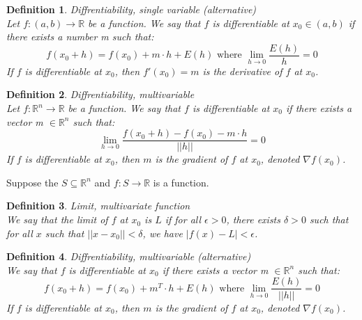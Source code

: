 \documentclass[11pt]{book} %
\newtheorem{definition}{Definition}[section]
\begin{document}
\bigbreak

\begin{definition}{Diffrentiability, single variable (alternative)} \\
Let $f: (a,b) \rightarrow \mathbb{R}$ be a function. We say that $f$ is differentiable at $x_0 \in (a,b)$ if there exists a number m such that:
\begin{equation}
    f(x_0 + h) = f(x_0) + m \cdot h + E(h) \text{ where } \lim_{h \rightarrow 0} \frac{E(h)}{h} = 0
\end{equation}
If $f$ is differentiable at $x_0$, then $f'(x_0) = m$ is the derivative of $f$ at $x_0$.
\end{definition}

\bigbreak

\begin{definition}{Diffrentiability, multivariable} \\
Let $f: \mathbb{R}^n \rightarrow \mathbb{R}$ be a function. We say that $f$ is differentiable at $x_0$ if there exists a vector m $\in \mathbb{R}^n$ such that:
\begin{equation}
    \lim_{h \rightarrow 0} \frac{f(x_0 + h) - f(x_0) - m \cdot h}{||h||} = 0
\end{equation}
If $f$ is differentiable at $x_0$, then $m$ is the gradient of $f$ at $x_0$, denoted $\nabla f(x_0)$.
\end{definition}

\bigbreak

Suppose the $S \subseteq \mathbb{R}^n$ and $f: S \rightarrow \mathbb{R}$ is a function. 

\bigbreak

\begin{definition}{Limit, multivariate function} \\
We say that the limit of $f$ at $x_0$ is $L$ if for all $\epsilon > 0$, there exists $\delta > 0$ such that 
for all $x$ such that $||x - x_0|| < \delta$, we have $|f(x) - L| < \epsilon$.
\end{definition}

\begin{definition}{Diffrentiability, multivariable (alternative)} \\
We say that $f$ is differentiable at $x_0$ if there exists a vector m $\in \mathbb{R}^n$ such that:
\begin{equation}
    f(x_0 + h) = f(x_0) + m^T \cdot h + E(h) \text{ where } \lim_{h \rightarrow 0} \frac{E(h)}{||h||} = 0
\end{equation}
If $f$ is differentiable at $x_0$, then $m$ is the gradient of $f$ at $x_0$, denoted $\nabla f(x_0)$.
\end{definition}
\end{document}
